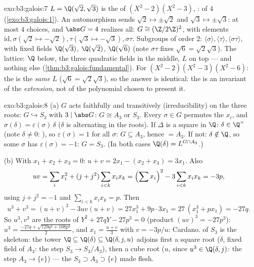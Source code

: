 \begin{solution}{exo:b3:galois:7}
$L = \Q(\sqrt2, \sqrt3)$ is the  of $(X^2 -
2)(X^2 - 3)$, :  of  $4$
(\cref{exo:b3:galois:1}). An automorphism sends $\sqrt2 \mapsto
\pm\sqrt2$ and $\sqrt3 \mapsto \pm\sqrt3$: at most $4$ choices,
and $\abs G = 4$ realizes all: $G \cong (\Z/2\Z)^2$, with
elements $\mathrm{id}, \sigma (\sqrt2 \mapsto -\sqrt2), \tau
(\sqrt3\mapsto-\sqrt3), \sigma\tau$. Subgroups of order $2$:
$\langle\sigma\rangle, \langle\tau\rangle,
\langle\sigma\tau\rangle$, with fixed fields $\Q(\sqrt3)$,
$\Q(\sqrt2)$, $\Q(\sqrt6)$ (note $\sigma\tau$ fixes $\sqrt6 =
\sqrt2\sqrt3$). The lattice: $\Q$ below, the three quadratic
fields in the middle, $L$ on top --- and nothing else
(\cref{thm:b3:galois:fundamental}). For $(X^2-2)(X^2-3)(X^2-6)$:
the  is the \emph{same} $L$ ($\sqrt6 =
\sqrt2\sqrt3$), so the answer is identical: the  is an invariant of the \emph{extension}, not of
the polynomial chosen to present it.
\end{solution}

\begin{solution}{exo:b3:galois:8}
(a) $G$ acts faithfully and transitively (irreducibility) on the
three roots: $G \hookrightarrow S_3$ with $3 \mid \abs G$: $G
\cong A_3$ or $S_3$. Every $\sigma \in G$ permutes the $x_i$, and
$\sigma(\delta) = \varepsilon(\sigma)\,\delta$ ($\delta$ is
alternating in the roots). If $\Delta$ is a square in $\Q$:
$\delta \in \Q^\times$ (note $\delta \neq 0$: ), so
$\varepsilon(\sigma) = 1$ for all $\sigma$: $G \subseteq A_3$,
hence $= A_3$. If not: $\delta \notin \Q$, so some $\sigma$ has
$\varepsilon(\sigma) = -1$: $G = S_3$. (In both cases $\Q(\delta)
= L^{G \cap A_3}$.)

(b) With $x_1 + x_2 + x_3 = 0$: $u + v = 2x_1 - (x_2 + x_3) =
3x_1$. Also
\[
uv = \sum_i x_i^2 + (j + j^2)\sum_{i<k}x_ix_k
= \Bigl(\sum x_i\Bigr)^2 - 3\sum_{i<k}x_ix_k = -3p,
\]
using $j + j^2 = -1$ and $\sum_{i<k}x_ix_k = p$. Then
\[
u^3 + v^3 = (u+v)^3 - 3uv(u+v) = 27x_1^3 + 9p\cdot 3x_1
= 27\,(x_1^3 + px_1) = -27q .
\]
So $u^3, v^3$ are the roots of $Y^2 + 27qY - 27p^3 = 0$
(product $(uv)^3 = -27p^3$): $u^3 = \frac{-27q +
\sqrt{729q^2 + 108p^3}}2$, and $x_1 = \frac{u + v}3$ with $v =
-3p/u$: Cardano.  of $S_3$ is the skeleton: the
tower $\Q \subseteq \Q(\delta) \subseteq \Q(\delta, j, u)$
adjoins first a square root ($\delta$, fixed field of $A_3$:
the step $S_3 \to S_3/A_3$), then a cube root ($u$, since $u^3
\in \Q(\delta, j)$: the step $A_3 \to \{e\}$) --- the  $S_3 \supset A_3 \supset \{e\}$ made flesh.
\end{solution}

